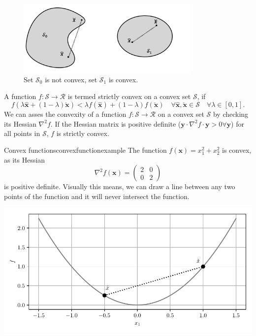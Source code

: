 \begin{figure}[!htpb]
    \centering
    \includegraphics[width=0.8\textwidth]{figures/convex_sets.png}
    \caption{Set $\mathcal{S}_0$ is not convex, set $\mathcal{S}_1$ is convex.}
    \label{fig:convex_sets}
\end{figure}

A function $f: \mathcal{S} \rightarrow \mathcal{R}$ is termed strictly convex on a convex set $\mathcal{S}$, if 
\begin{equation}
    f(\lambda \hat{\mathbf{x}} + (1-\lambda) \check{\mathbf{x}}) <  \lambda f(\hat{\mathbf{x}}) + (1-\lambda) f(\check{\mathbf{x}}) \quad \forall \hat{\mathbf{x}}, \check{\mathbf{x}} \in \mathcal{S} \quad  \forall \lambda \in [0,1].
\end{equation}
We can asses the convexity of a function $f: \mathcal{S} \rightarrow \mathcal{R}$ on a convex set $\mathcal{S}$ by checking its Hessian $\nabla^2 f$. If the Hessian matrix is positive definite ($\mathbf{y} \cdot \nabla^2 f \cdot  \mathbf{y} > 0 \forall \mathbf{y}$) for all points in $\mathcal{S}$,  $f$ is strictly convex.

\begin{example}{Convex functions}{convexfunctionexample}
    The function $f(\mathbf{x})=x_1^2 + x_2^2$ is convex, as its Hessian \begin{equation}
        \nabla^2f(\mathbf{x}) = 
        \begin{pmatrix}
        2 & 0 \\ 
        0       & 2         
        \end{pmatrix}
    \end{equation} 
    is positive definite. Visually this means, we can draw a line between any two points of the function and it will never intersect the function.

    \includegraphics[width=\textwidth]{figures/convex_function_0.pdf}
\end{example}


